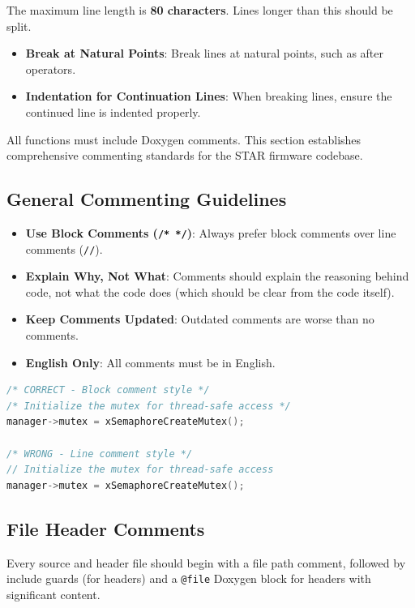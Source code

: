 The maximum line length is \textbf{80 characters}. Lines longer than this should be split.
\begin{itemize}
    \item \textbf{Break at Natural Points}: Break lines at natural points, such as after operators.
    \item \textbf{Indentation for Continuation Lines}: When breaking lines, ensure the continued line is indented properly.
\end{itemize}



All functions must include Doxygen comments. This section establishes comprehensive commenting standards for the STAR firmware codebase.

\subsection{General Commenting Guidelines}

\begin{itemize}
    \item \textbf{Use Block Comments (\texttt{/* */})}: Always prefer block comments over line comments (\texttt{//}).
    \item \textbf{Explain Why, Not What}: Comments should explain the reasoning behind code, not what the code does (which should be clear from the code itself).
    \item \textbf{Keep Comments Updated}: Outdated comments are worse than no comments.
    \item \textbf{English Only}: All comments must be in English.
\end{itemize}

\begin{lstlisting}[language=C]
/* CORRECT - Block comment style */
/* Initialize the mutex for thread-safe access */
manager->mutex = xSemaphoreCreateMutex();

/* WRONG - Line comment style */
// Initialize the mutex for thread-safe access
manager->mutex = xSemaphoreCreateMutex();
\end{lstlisting}

\subsection{File Header Comments}

Every source and header file should begin with a file path comment, followed by include guards (for headers) and a \texttt{@file} Doxygen block for headers with significant content.

